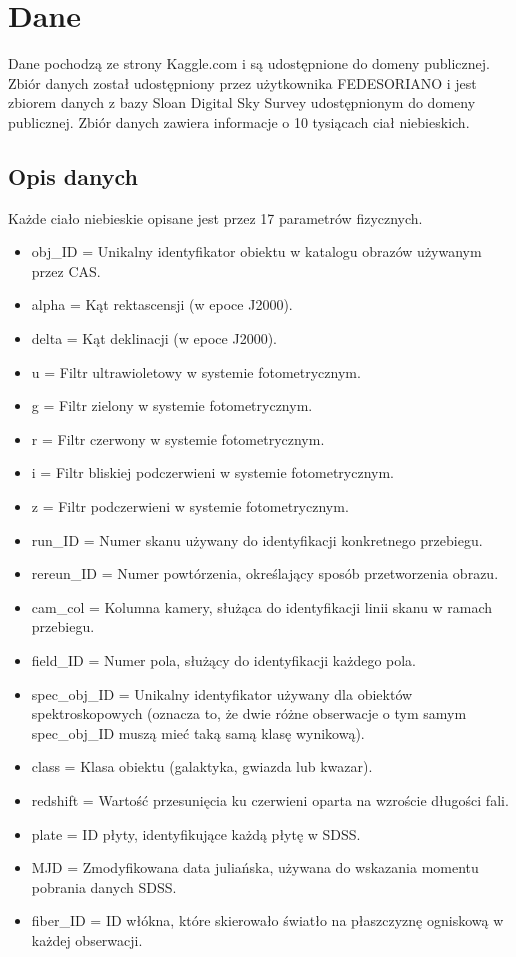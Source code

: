 \documentclass{article}
\begin{document}
\section{Dane}
Dane pochodzą ze strony Kaggle.com i są udostępnione do domeny publicznej. Zbiór danych został udostępniony przez
użytkownika FEDESORIANO i jest zbiorem danych z bazy Sloan Digital Sky Survey udostępnionym do domeny publicznej.
Zbiór danych zawiera informacje o 10 tysiącach ciał niebieskich.
\subsection{Opis danych}
Każde ciało niebieskie opisane jest przez 17 parametrów fizycznych.
\begin{itemize}
    \item obj\_ID = Unikalny identyfikator obiektu w katalogu obrazów używanym przez CAS.
    \item alpha = Kąt rektascensji (w epoce J2000).
    \item delta = Kąt deklinacji (w epoce J2000).
    \item u = Filtr ultrawioletowy w systemie fotometrycznym.
    \item g = Filtr zielony w systemie fotometrycznym.
    \item r = Filtr czerwony w systemie fotometrycznym.
    \item i = Filtr bliskiej podczerwieni w systemie fotometrycznym.
    \item z = Filtr podczerwieni w systemie fotometrycznym.
    \item run\_ID = Numer skanu używany do identyfikacji konkretnego przebiegu.
    \item rereun\_ID = Numer powtórzenia, określający sposób przetworzenia obrazu.
    \item cam\_col = Kolumna kamery, służąca do identyfikacji linii skanu w ramach przebiegu.
    \item field\_ID = Numer pola, służący do identyfikacji każdego pola.
    \item spec\_obj\_ID = Unikalny identyfikator używany dla obiektów spektroskopowych (oznacza to, że dwie różne obserwacje o tym samym spec\_obj\_ID muszą mieć taką samą klasę wynikową).
    \item class = Klasa obiektu (galaktyka, gwiazda lub kwazar).
    \item redshift = Wartość przesunięcia ku czerwieni oparta na wzroście długości fali.
    \item plate = ID płyty, identyfikujące każdą płytę w SDSS.
    \item MJD = Zmodyfikowana data juliańska, używana do wskazania momentu pobrania danych SDSS.
    \item fiber\_ID = ID włókna, które skierowało światło na płaszczyznę ogniskową w każdej obserwacji.
    \end{itemize}
\end{document}
